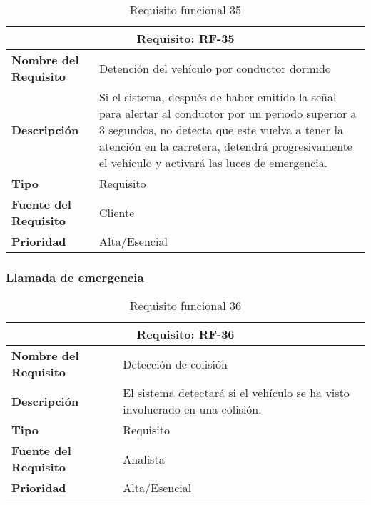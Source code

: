 \begin{table}[H]
\begin{center}
\begin{tabular}{p{} p{7cm}}
\multicolumn{2}{c}{\textbf{Requisito: RF-35} } \\
\hline \hline
\textbf{Nombre del Requisito} & Detención del vehículo por conductor dormido\\
\hline
\textbf{Descripción} & Si el sistema, después de haber emitido la señal para alertar al conductor por un periodo superior a 3 segundos, no detecta que este vuelva a tener la atención en la carretera, detendrá progresivamente el vehículo y activará las luces de emergencia.\\
\hline
\textbf{Tipo} & Requisito  \\
\hline
\textbf{Fuente del Requisito} & Cliente  \\
\hline
\textbf{Prioridad} & Alta/Esencial  \\ \hline
\end{tabular}
\caption{Requisito funcional 35}
\label{tab:RF-35}
\end{center}
\end{table}



\subsubsection{Llamada de emergencia}

\begin{table}[H]
\begin{center}
\begin{tabular}{p{} p{7cm}}
\multicolumn{2}{c}{\textbf{Requisito: RF-36} } \\
\hline \hline
\textbf{Nombre del Requisito} & Detección de colisión\\
\hline
\textbf{Descripción} &El sistema detectará si el vehículo se ha visto involucrado en una colisión.\\
\hline
\textbf{Tipo} & Requisito  \\
\hline
\textbf{Fuente del Requisito} & Analista  \\
\hline
\textbf{Prioridad} & Alta/Esencial  \\ \hline
\end{tabular}
\caption{Requisito funcional 36}
\label{tab:RF-36}
\end{center}
\end{table}

